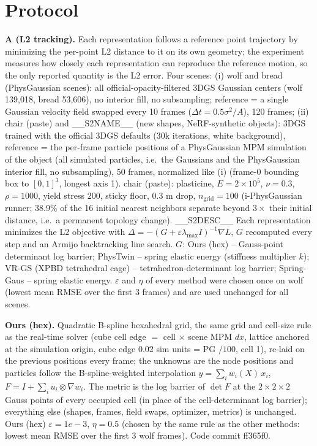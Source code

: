 \section*{Protocol}
\textbf{A (L2 tracking).} Each representation follows a reference point trajectory by minimizing the per-point L2 distance to it on its own geometry; the experiment measures how closely each representation can reproduce the reference motion, so the only reported quantity is the L2 error.
Four scenes:
(i) wolf and bread (PhysGaussian scenes): all official-opacity-filtered 3DGS Gaussian centers (wolf 139{,}018, bread 53{,}606), no interior fill, no subsampling; reference = a single Gaussian velocity field swapped every 10 frames ($\Delta t = 0.5\sigma^2/A$), 120 frames;
(ii) chair (paste) and __S2NAME__ (new shapes, NeRF-synthetic objects): 3DGS trained with the official 3DGS defaults (30k iterations, white background), reference = the per-frame particle positions of a PhysGaussian MPM simulation of the object (all simulated particles, i.e.\ the Gaussians and the PhysGaussian interior fill, no subsampling), 50 frames, normalized like (i) (frame-0 bounding box to $[0,1]^3$, longest axis 1).
chair (paste): plasticine, $E=2{\times}10^5$, $\nu=0.3$, $\rho=1000$, yield stress $200$, sticky floor, 0.3 m drop, $n_\text{grid}=100$ (i-PhysGaussian runner; 38.9\% of the 16 initial nearest neighbors separate beyond $3\times$ their initial distance, i.e.\ a permanent topology change). __S2DESC__
Each representation minimizes the L2 objective with $\Delta=-(G+\varepsilon\lambda_{\max}I)^{-1}\nabla L$, $G$ recomputed every step and an Armijo backtracking line search. $G$: Ours (hex) -- Gauss-point determinant log barrier; PhysTwin -- spring elastic energy (stiffness multiplier $k$); VR-GS (XPBD tetrahedral cage) -- tetrahedron-determinant log barrier; Spring-Gaus -- spring elastic energy.
$\varepsilon$ and $\eta$ of every method were chosen once on wolf (lowest mean RMSE over the first 3 frames) and are used unchanged for all scenes.

\textbf{Ours (hex).} Quadratic B-spline hexahedral grid, the same grid and cell-size rule as the real-time solver
(cube cell edge $=$ cell $\times$ scene MPM $dx$, lattice anchored at the simulation origin, cube edge 0.02 sim units = PG $ /100$, cell 1),
re-laid on the previous positions every frame; the unknowns are the node positions and particles follow the
B-spline-weighted interpolation $y=\sum_i w_i(X)\,x_i$, $F=I+\sum_i u_i\otimes\nabla w_i$. The metric is the
log barrier of $\det F$ at the $2{\times}2{\times}2$ Gauss points of every occupied cell (in place of the cell-determinant
log barrier); everything else (shapes, frames, field swaps, optimizer, metrics) is unchanged. Ours (hex) $\varepsilon=1e-3$, $\eta=0.5$ (chosen by the same rule as the other methods: lowest mean RMSE over the first 3 wolf frames). Code commit ff365f0.

